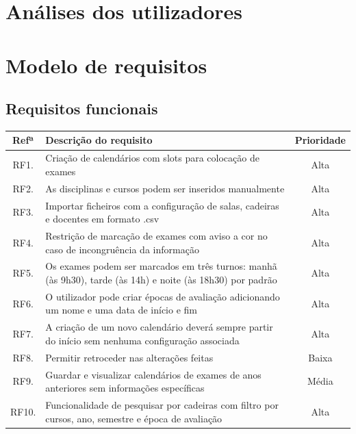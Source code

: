 \documentclass[11pt, twoside]{report}
\begin{document}
 	

	\chapter{Análises dos utilizadores}
	
	\chapter{Modelo de requisitos}
	\section{Requisitos funcionais}

	\pagebreak %
	\begin{center}
				\begin{tabularx}{\textwidth}{|c|X|c|}
				\hline
				\textbf{Refª }	& \textbf{Descrição do requisito} & \textbf{Prioridade} \\
				\hline
				RF1. & Criação de calendários com slots para colocação de exames & Alta \\
				\hline
				RF2. & As disciplinas e cursos podem ser inseridos manualmente & Alta\\
				\hline
				RF3. & Importar ficheiros com a configuração de salas, cadeiras e docentes em formato .csv & Alta \\
				\hline
				RF4. &  Restrição de marcação de exames com aviso a cor no caso de incongruência da informação & Alta \\
				\hline
				RF5. & Os exames podem ser marcados em três turnos: manhã (às 9h30), tarde (às 14h) e noite (às 18h30) por padrão & Alta \\
				\hline
				RF6. & O utilizador pode criar épocas de avaliação adicionando um nome e uma data de início e fim & Alta \\
				\hline
				RF7. & A criação de um novo calendário deverá sempre partir do início sem nenhuma configuração associada & Alta\\
				\hline
				RF8. & Permitir retroceder nas alterações feitas & Baixa \\
				\hline
				RF9. & Guardar e visualizar calendários de exames de anos anteriores sem informações específicas  & Média \\
				\hline
				RF10.  & Funcionalidade de pesquisar por cadeiras com filtro por cursos, ano, semestre e época de avaliação  & Alta \\

\end{tabularx}
\end{center}
\end{document}
